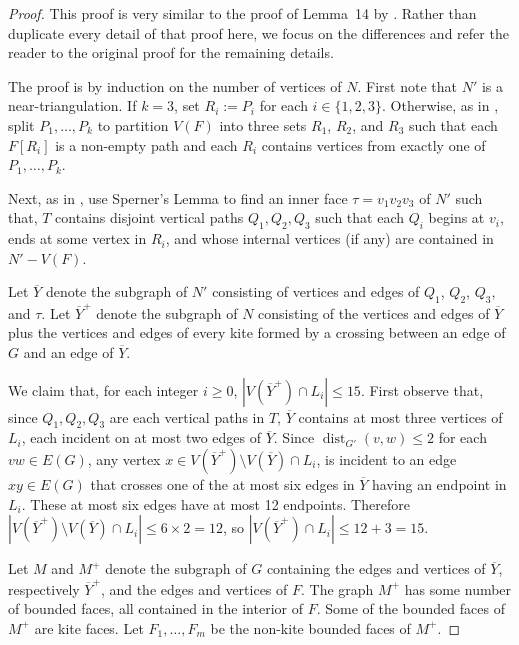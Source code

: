 \documentclass{patmorin}
\DeclareMathOperator{\dist}{dist}
\renewcommand{\ge}{\geqslant}
\renewcommand{\le}{\leqslant}
\begin{document}
\begin{proof}
	This proof is very similar to the proof of Lemma~14 by \citet{dujmovic.joret.ea:planar}. Rather than duplicate every detail of that proof here, we focus on the differences and refer the reader to the original proof for the remaining details.
	
	The proof is by induction on the number of vertices of $N$.
	First note that $N'$ is a near-triangulation.  If $k=3$, set $R_i := P_i$ for each $i\in\{1,2,3\}$.  Otherwise, as in \citep{dujmovic.joret.ea:planar}, split $P_1,\ldots,P_k$ to partition $V(F)$ into three sets $R_1$, $R_2$, and $R_3$ such that each $F[R_i]$ is a non-empty path and each $R_i$ contains vertices from exactly one of $P_1,\ldots,P_k$.
	
	Next, as in \citep{dujmovic.joret.ea:planar}, use Sperner's Lemma to find an inner face $\tau=v_1v_2v_3$ of $N'$ such that, $T$ contains disjoint vertical paths $Q_1,Q_2,Q_3$ such that each $Q_i$ begins at $v_i$, ends at some vertex in $R_i$, and whose internal vertices (if any) are contained in $N'-V(F)$.
	
	Let $\overline{Y}$ denote the subgraph of $N'$ consisting of vertices and edges of $Q_1$, $Q_2$, $Q_3$, and $\tau$.  Let $\overline{Y}^+$ denote the subgraph of $N$ consisting of the vertices and edges of $\overline{Y}$ plus the vertices and edges of every kite formed by a crossing between an edge of $G$ and an edge of $\overline{Y}$.
	
	We claim that, for each integer $i\ge 0$, $|V(\overline{Y}^+)\cap L_i|\le 15$.  First observe that, since $Q_1,Q_2,Q_3$ are each vertical paths in $T$,  $\overline{Y}$ contains at most three vertices of $L_i$, each incident on at most two edges of $\overline{Y}$.  Since $\dist_{G'}(v,w)\le 2$ for each $vw\in E(G)$, any vertex $x\in V(\overline{Y}^+)\setminus V(\overline{Y})\cap L_i$, is incident to an edge $xy\in E(G)$ that crosses one of the at most six edges in $\overline{Y}$ having an endpoint in $L_i$.  These at most six edges have at most 12 endpoints.  Therefore $|V(\overline{Y}^+)\setminus V(\overline{Y})\cap L_i|\le 6\times 2=12$, so $|V(\overline{Y}^+)\cap L_i|\le 12+3=15$.
	
	Let $M$ and $M^+$ denote the subgraph of $G$ containing the edges and vertices of $\overline{Y}$, respectively $\overline{Y}^+$, and the edges and vertices of $F$.  The graph $M^+$ has some number of bounded faces, all contained in the interior of $F$. Some of the bounded faces of $M^+$ are kite faces. Let $F_1,\ldots,F_m$ be the non-kite bounded faces of $M^+$.
	

\end{proof}
\end{document}
